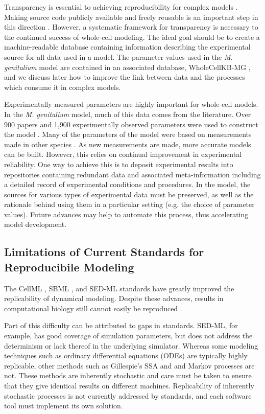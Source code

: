 \documentclass[journal,transmag,twoside]{IEEEtran}
\begin{document}
Transparency is essential to achieving reproducibility for complex models \cite{boulton2012open}.
Making source code publicly available and freely reusable is an important step in this direction \cite{easterbrook2014open}.
However, a systematic framework for transparency is necessary to the continued success of whole-cell modeling.
The ideal goal should be to create a machine-readable database containing information describing the experimental source for all data used in a model.
The parameter values used in the \textit{M. genitalium} model are contained in an associated database, WholeCellKB-MG \cite{karr2013wholecellkb},
and we discuss later how to improve the link between data and the processes which consume it in complex models.

Experimentally measured parameters are highly important for whole-cell models.
In the \textit{M. genitalium} model, much of this data comes from the literature.
Over 900 papers and 1,900 experimentally observed parameters were used to construct the model \cite{Karr2012}.
Many of the parameters of the model were based on measurements made in other species \cite{macklin2014future}.
As new measurements are made, more accurate models can be built.
However, this relies on continual improvement in experimental reliability.
One way to achieve this is to deposit experimental results into repositories
containing redundant data and associated meta-information including
a detailed record of experimental conditions and procedures.
In the model, the sources for various types of experimental data must be preserved,
as well as the rationale behind using them in a particular setting
(e.g. the choice of parameter values).
Future advances may help to automate this process, thus accelerating model development.

\subsection{Limitations of Current Standards for Reproducibile Modeling}

The CellML \cite{cuellar2003overview}, SBML \cite{hucka2003}, and SED-ML \cite{sedml2011} standards have greatly improved the replicability of dynamical modeling.
Despite these advances, results in computational biology still cannot easily be reproduced \cite{garijo2013quantifying}.

Part of this difficulty can be attributed to gaps in standards.
SED-ML, for example, has good coverage of simulation parameters, but
does not address the determinism or lack thereof in the underlying simulator.
Whereas some modeling techniques such as ordinary differential equations (ODEs)
are typically highly replicable, other methods such as Gillespie's SSA and
and Markov processes are not. These methods are inherently stochastic and care
must be taken to ensure that they give identical results on different machines.
Replicability of inherently stochastic processes is not currently addressed by standards,
and each software tool must implement its own solution.
\end{document}
